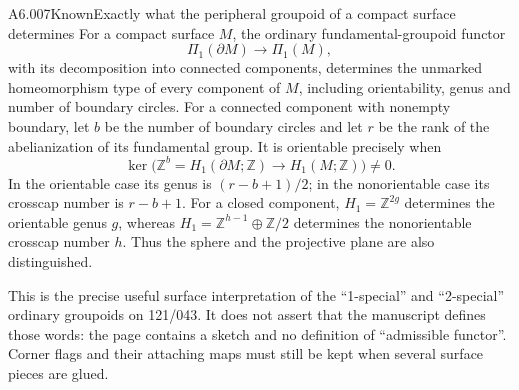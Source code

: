 \begin{saresult}{A6.007}{Known}{Exactly what the peripheral groupoid of a compact surface determines}
For a compact surface $M$, the ordinary fundamental-groupoid functor
\[
 \Pi_1(\partial M)\longrightarrow\Pi_1(M),
\]
with its decomposition into connected components, determines the
unmarked homeomorphism type of every component of $M$, including
orientability, genus and number of boundary circles. For a connected
component with nonempty boundary, let $b$ be the number of boundary
circles and let $r$ be the rank of the abelianization of its
fundamental group. It is orientable precisely when
\[
 \ker\bigl(\mathbb Z^b=H_1(\partial M;\mathbb Z)
       \longrightarrow H_1(M;\mathbb Z)\bigr)\ne0.
\]
In the orientable case its genus is $(r-b+1)/2$; in the nonorientable
case its crosscap number is $r-b+1$. For a closed component,
$H_1=\mathbb Z^{2g}$ determines the orientable genus $g$, whereas
$H_1=\mathbb Z^{h-1}\oplus\mathbb Z/2$ determines the nonorientable
crosscap number $h$. Thus the sphere and the projective plane are
also distinguished.

This is the precise useful surface interpretation of the
``1-special'' and ``2-special'' ordinary groupoids on 121/043.
It does not assert that the manuscript defines those words:
the page contains a sketch and no definition of ``admissible
functor''. Corner flags and their attaching maps must still be kept
when several surface pieces are glued.
\end{saresult}
